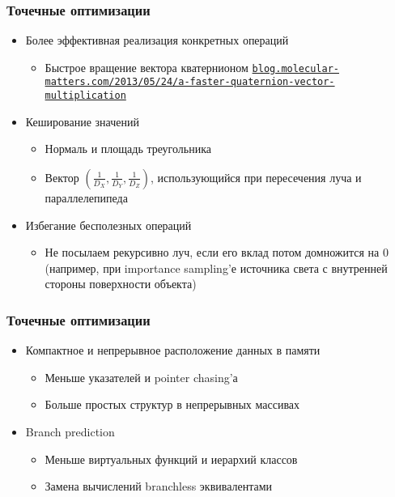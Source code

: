 \documentclass[handout,10pt]{beamer}
\begin{document}
\begin{frame}[fragile]
\frametitle{Точечные оптимизации}
\begin{itemize}
\item Более эффективная реализация конкретных операций
\pause
\begin{itemize}
\item Быстрое вращение вектора кватернионом \href{https://blog.molecular-matters.com/2013/05/24/a-faster-quaternion-vector-multiplication/}{\texttt{blog.molecular-matters.com/2013/05/24/a-faster-quaternion-vector-multiplication}}
\end{itemize}
\pause
\item Кеширование значений
\pause
\begin{itemize}
\item Нормаль и площадь треугольника
\pause
\item Вектор \begin{math}\left(\frac{1}{D_X}, \frac{1}{D_Y}, \frac{1}{D_Z}\right)\end{math}, использующийся при пересечения луча и параллелепипеда
\end{itemize}
\pause
\item Избегание бесполезных операций
\pause
\begin{itemize}
\item Не посылаем рекурсивно луч, если его вклад потом домножится на 0 (например, при importance sampling'е источника света с внутренней стороны поверхности объекта)
\end{itemize}
\end{itemize}
\end{frame}

\begin{frame}[fragile]
\frametitle{Точечные оптимизации}
\begin{itemize}
\item Компактное и непрерывное расположение данных в памяти
\pause
\begin{itemize}
\item Меньше указателей и pointer chasing'а
\pause
\item Больше простых структур в непрерывных массивах
\end{itemize}
\pause
\item Branch prediction
\pause
\begin{itemize}
\item Меньше виртуальных функций и иерархий классов
\pause
\item Замена вычислений branchless эквивалентами
\end{itemize}
\end{itemize}
\end{frame}
\end{document}
